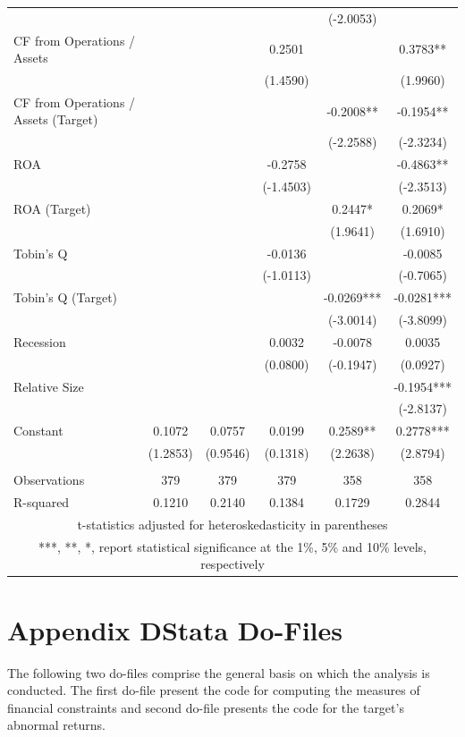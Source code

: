 \documentclass[12pt]{article}
\begin{document}
\begin{appendices}
\begin{table}[!htbp]
\begin{adjustbox}{max width=\textwidth}
\begin{tabular}{lccccc}
			&  &  &  & (-2.0053) &  \\
		   CF from Operations / Assets &  &  & 0.2501 &  & 0.3783** \\
			&  &  & (1.4590) &  & (1.9960) \\
		   CF from Operations / Assets (Target) &  &  &  & -0.2008** & -0.1954** \\
			&  &  &  & (-2.2588) & (-2.3234) \\
		   ROA &  &  & -0.2758 &  & -0.4863** \\
			&  &  & (-1.4503) &  & (-2.3513) \\
		   ROA (Target) &  &  &  & 0.2447* & 0.2069* \\
			&  &  &  & (1.9641) & (1.6910) \\
		   Tobin's Q &  &  & -0.0136 &  & -0.0085 \\
			&  &  & (-1.0113) &  & (-0.7065) \\
		   Tobin's Q (Target) &  &  &  & -0.0269*** & -0.0281*** \\
			&  &  &  & (-3.0014) & (-3.8099) \\
		   Recession &  &  & 0.0032 & -0.0078 & 0.0035 \\
			&  &  & (0.0800) & (-0.1947) & (0.0927) \\
		   Relative Size &  &  &  &  & -0.1954*** \\
			&  &  &  &  & (-2.8137) \\
		   Constant & 0.1072 & 0.0757 & 0.0199 & 0.2589** & 0.2778*** \\
			& (1.2853) & (0.9546) & (0.1318) & (2.2638) & (2.8794) \\
			&  &  &  &  &  \\
		   Observations & 379 & 379 & 379 & 358 & 358 \\
			R-squared & 0.1210 & 0.2140 & 0.1384 & 0.1729 & 0.2844 \\ \hline
			\multicolumn{6}{c}{ t-statistics adjusted for heteroskedasticity in parentheses} \\
			\multicolumn{6}{c}{ ***, **, *, report statistical significance at the 1\%, 5\% and 10\% levels, respectively}\\
		   \end{tabular}						
	\end{adjustbox}
\end{table}
\pagebreak


\section*{Appendix D\indent Stata Do-Files}
\noindent The following two do-files comprise the general basis on which the analysis is conducted. The first do-file present the code for computing the measures of financial constraints and second do-file presents the code for the target's abnormal returns. 



\end{appendices}
\end{document}
